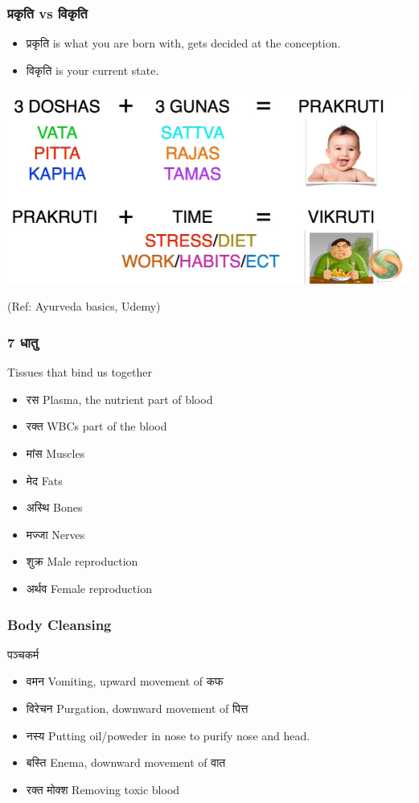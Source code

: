 \begin{frame}[fragile]\frametitle{प्रकृति vs विकृति}


	\begin{itemize}
	\item प्रकृति is what you are born with, gets decided at the conception.
	\item विकृति is your current state.
	\end{itemize}

\begin{center}
\includegraphics[width=0.7\linewidth,keepaspectratio]{images/ayur4}
\end{center}

{\tiny (Ref: Ayurveda basics, Udemy)}

\end{frame}

\begin{frame}[fragile]\frametitle{7 धातु}

Tissues that bind us together

	\begin{itemize}
	\item  रस Plasma, the nutrient part of blood
	\item रक्त WBCs part of the blood
	\item मांस Muscles
	\item मेद Fats
	\item अस्थि Bones
	\item मज्जा Nerves
	\item शुक्र Male reproduction
	\item अर्थव Female reproduction

	\end{itemize}

\end{frame}

\begin{frame}[fragile]\frametitle{Body Cleansing}
पञ्चकर्म

	\begin{itemize}
	\item  वमन Vomiting, upward movement of कफ
	\item विरेचन Purgation, downward movement of पित्त
	\item नस्य Putting oil/poweder in nose to purify nose and head.
	\item बस्ति Enema, downward movement of वात
	\item रक्त मोक्श Removing toxic blood
	\end{itemize}

\end{frame}


